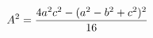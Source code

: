 \documentclass[preview]{standalone}
\begin{document}
\begin{align*}
\special{dvisvgm:raw <g id='unique000'>}A^2 = \frac{4a^2c^2-(a^2-b^2+c^2)^2}{16}\special{dvisvgm:raw </g>}
\end{align*}
\end{document}
